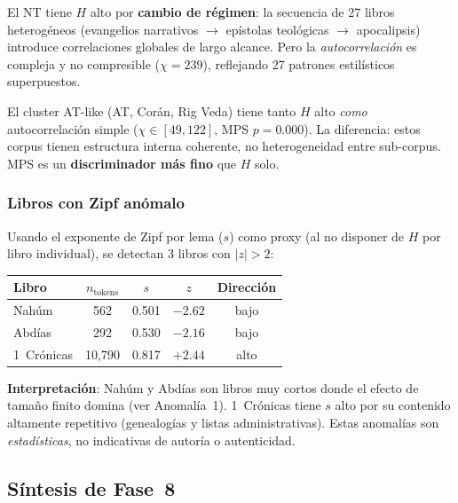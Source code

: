 \documentclass[12pt,a4paper]{article}
\begin{document}
\noindent
El NT tiene $H$ alto por \textbf{cambio de r\'egimen}: la secuencia de 27 libros
heterog\'eneos (evangelios narrativos $\rightarrow$ ep\'istolas teol\'ogicas $\rightarrow$
apocalipsis) introduce correlaciones globales de largo alcance.
Pero la \emph{autocorrelaci\'on} es compleja y no compresible ($\chi = 239$),
reflejando 27 patrones estil\'isticos superpuestos.

El cluster AT-like (AT, Cor\'an, Rig Veda) tiene tanto $H$ alto
\emph{como} autocorrelaci\'on simple ($\chi \in [49, 122]$, MPS $p = 0.000$).
La diferencia: estos corpus tienen estructura interna coherente,
no heterogeneidad entre sub-corpus. MPS es un \textbf{discriminador m\'as fino}
que $H$ solo.

\subsubsection{Libros con Zipf an\'omalo}

Usando el exponente de Zipf por lema ($s$) como proxy (al no disponer de $H$
por libro individual), se detectan 3 libros con $|z| > 2$:

\begin{center}
\begin{tabular}{lcccc}
\toprule
\textbf{Libro} & \textbf{$n_{\text{tokens}}$} & \textbf{$s$} & \textbf{$z$} & \textbf{Direcci\'on} \\
\midrule
Nah\'um       & 562    & 0.501 & $-2.62$ & bajo \\
Abd\'ias      & 292    & 0.530 & $-2.16$ & bajo \\
1~Cr\'onicas  & 10,790 & 0.817 & $+2.44$ & alto \\
\bottomrule
\end{tabular}
\end{center}

\noindent
\textbf{Interpretaci\'on}: Nah\'um y Abd\'ias son libros muy cortos donde el efecto
de tama\~no finito domina (ver Anomal\'ia~1). 1~Cr\'onicas tiene $s$ alto por su
contenido altamente repetitivo (genealog\'ias y listas administrativas).
Estas anomal\'ias son \emph{estad\'isticas}, no indicativas de autor\'ia o autenticidad.

\subsection{S\'intesis de Fase~8}
\end{document}
